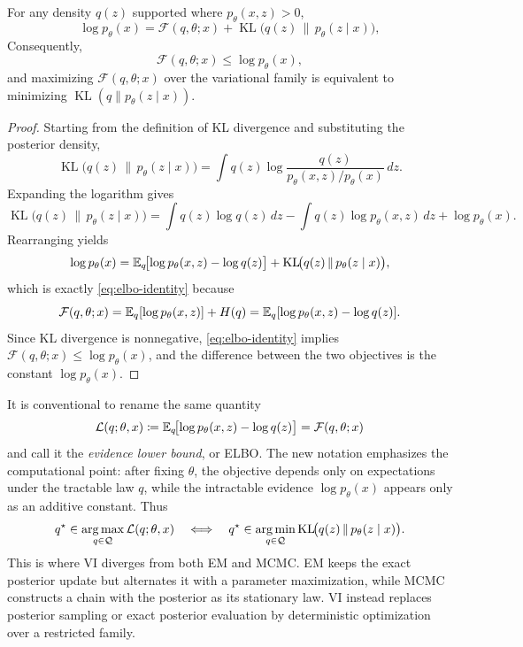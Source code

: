 \begin{proposition}
\label{prop:elbo-identity}
For any density \(q(z)\) supported where \(p_\theta(x,z)>0\),
\begin{equation}
  \log p_\theta(x)
  =
  \mathcal{F}(q,\theta;x)
  +
  \operatorname{KL}\!\bigl(q(z)\,\|\,p_\theta(z\mid x)\bigr),
  \label{eq:elbo-identity}
\end{equation}
Consequently,
\[
  \mathcal{F}(q,\theta;x) \le \log p_\theta(x),
\]
and maximizing \(\mathcal{F}(q,\theta;x)\) over the variational family is equivalent to minimizing \(\operatorname{KL}(q\|p_\theta(z\mid x))\).
\end{proposition}
\begin{proof}
Starting from the definition of KL divergence and substituting the posterior density,
\[
  \operatorname{KL}\!\bigl(q(z)\,\|\,p_\theta(z\mid x)\bigr)
  =
  \int q(z)\log\frac{q(z)}{p_\theta(x,z)/p_\theta(x)}\,dz.
\]
Expanding the logarithm gives
\[
  \operatorname{KL}\!\bigl(q(z)\,\|\,p_\theta(z\mid x)\bigr)
  =
  \int q(z)\log q(z)\,dz
  -
  \int q(z)\log p_\theta(x,z)\,dz
  +
  \log p_\theta(x).
\]
Rearranging yields
\[
  \log p_\theta(x)
  =
  \mathbb{E}_q\!\bigl[\log p_\theta(x,z)-\log q(z)\bigr]
  +
  \operatorname{KL}\!\bigl(q(z)\,\|\,p_\theta(z\mid x)\bigr),
\]
which is exactly \eqref{eq:elbo-identity} because
\[
  \mathcal{F}(q,\theta;x)
  =
  \mathbb{E}_q[\log p_\theta(x,z)] + H(q)
  =
  \mathbb{E}_q[\log p_\theta(x,z)-\log q(z)].
\]
Since KL divergence is nonnegative, \eqref{eq:elbo-identity} implies \(\mathcal{F}(q,\theta;x)\le \log p_\theta(x)\), and the difference between the two objectives is the constant \(\log p_\theta(x)\).%
\end{proof}

It is conventional to rename the same quantity
\begin{equation}
  \mathcal{L}(q;\theta,x)
  \coloneqq
  \mathbb{E}_q\!\bigl[\log p_\theta(x,z)-\log q(z)\bigr]
  =
  \mathcal{F}(q,\theta;x)
  \label{eq:elbo-definition}
\end{equation}
and call it the \emph{evidence lower bound}, or ELBO.
The new notation emphasizes the computational point: after fixing \(\theta\), the objective depends only on expectations under the tractable law \(q\), while the intractable evidence \(\log p_\theta(x)\) appears only as an additive constant.
Thus
\begin{equation}
  q^\star
  \in
  \operatorname*{arg\,max}_{q\in\mathcal{Q}} \mathcal{L}(q;\theta,x)
  \quad\Longleftrightarrow\quad
  q^\star
  \in
  \operatorname*{arg\,min}_{q\in\mathcal{Q}} \operatorname{KL}\!\bigl(q(z)\,\|\,p_\theta(z\mid x)\bigr).
  \label{eq:vi-kl-objective}
\end{equation}
This is where VI diverges from both EM and MCMC.
EM keeps the exact posterior update but alternates it with a parameter maximization, while MCMC constructs a chain with the posterior as its stationary law.
VI instead replaces posterior sampling or exact posterior evaluation by deterministic optimization over a restricted family.

